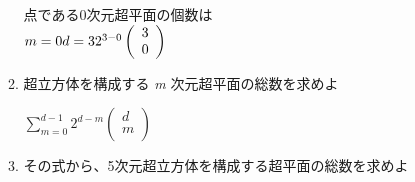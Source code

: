 \documentclass[11pt]{article}
\begin{document}
\begin{enumerate}
\begin{enumerate}
点である0次元超平面の個数は\\
\(m = 0 \\ d = 3 \\ 2^{3-0}\left ( \begin{array}{c} 3 \\ 0 \\ \end{array} \right )\)
\item 超立方体を構成する \emph{m} 次元超平面の総数を求めよ
\label{sec:orgheadline12}

\(\sum_{m=0}^{d-1}2^{d-m} \left ( \begin{array}{c} d \\ m \\ \end{array} \right )\)

\item その式から、5次元超立方体を構成する超平面の総数を求めよ
\label{sec:orgheadline13}
\end{enumerate}
\end{enumerate}
\end{document}
